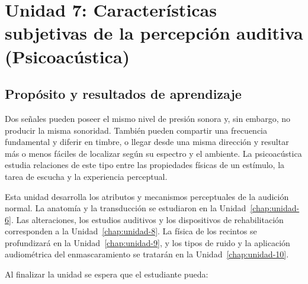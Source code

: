 \chapter{Unidad 7: Características subjetivas de la percepción auditiva
(Psicoacústica)}
\label{chap:unidad-7}

\section{Propósito y resultados de aprendizaje}
\label{sec:u7-proposito}

Dos señales pueden poseer el mismo nivel de presión sonora y, sin embargo,
no producir la misma sonoridad. También pueden compartir una frecuencia
fundamental y diferir en timbre, o llegar desde una misma dirección y resultar
más o menos fáciles de localizar según su espectro y el ambiente. La
psicoacústica estudia relaciones de este tipo entre las propiedades físicas de
un estímulo, la tarea de escucha y la experiencia perceptual.

Esta unidad desarrolla los atributos y mecanismos perceptuales de la audición
normal. La anatomía y la transducción se estudiaron en la
Unidad~\ref{chap:unidad-6}. Las
alteraciones, los estudios auditivos y los dispositivos de rehabilitación
corresponden a la Unidad~\ref{chap:unidad-8}. La física de los recintos se
profundizará en la Unidad~\ref{chap:unidad-9}, y los tipos de ruido y la
aplicación audiométrica del
enmascaramiento se tratarán en la Unidad~\ref{chap:unidad-10}.

Al finalizar la unidad se espera que el estudiante pueda:

